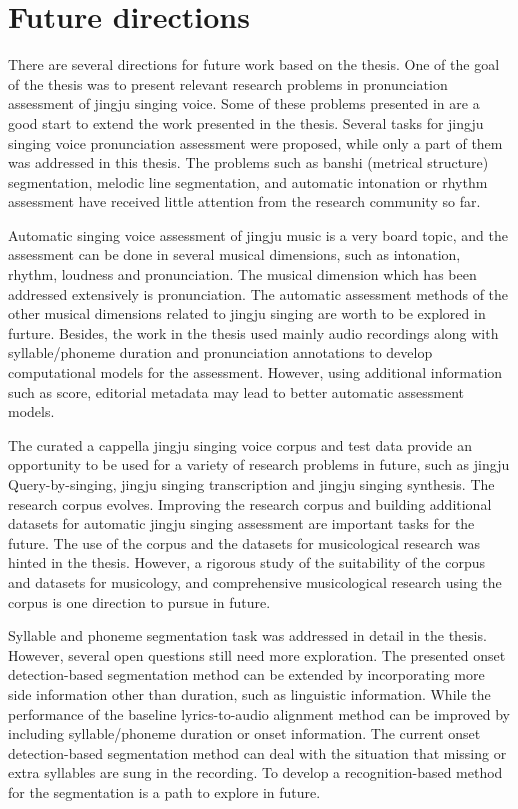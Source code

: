 \section{Future directions}

There are several directions for future work based on the thesis. One of the goal of the thesis was to present relevant research problems in pronunciation assessment of jingju singing voice. Some of these problems presented in  are a good start to extend the work presented in the thesis. Several tasks for jingju singing voice pronunciation assessment were proposed, while only a part of them was addressed in this thesis. The problems such as banshi (metrical structure) segmentation, melodic line segmentation, and automatic intonation or rhythm assessment have received little attention from the research community so far.

Automatic singing voice assessment of jingju music is a very board topic, and the assessment can be done in several musical dimensions, such as intonation, rhythm, loudness and pronunciation. The musical dimension which has been addressed extensively is pronunciation. The automatic assessment methods of the other musical dimensions related to jingju singing are worth to be explored in furture. Besides, the work in the thesis used mainly audio recordings along with syllable/phoneme duration and pronunciation annotations to develop computational models for the assessment. However, using additional information such as score, editorial metadata may lead to better automatic assessment models.

The curated a cappella jingju singing voice corpus and test data provide an opportunity to be used for a variety of research problems in future, such as jingju Query-by-singing, jingju singing transcription and jingju singing synthesis. The research corpus evolves. Improving the research corpus and building additional datasets for automatic jingju singing assessment are important tasks for the future. The use of the corpus and the datasets for musicological research was hinted in the thesis. However, a rigorous study of the suitability of the corpus and datasets for musicology, and comprehensive musicological research using the corpus is one direction to pursue in future.

Syllable and phoneme segmentation task was addressed in detail in the thesis. However, several open questions still need more exploration. The presented onset detection-based segmentation method can be extended by incorporating more side information other than duration, such as linguistic information. While the performance of the baseline lyrics-to-audio alignment method can be improved by including syllable/phoneme duration or onset information. The current onset detection-based segmentation method can deal with the situation that missing or extra syllables are sung in the recording. To develop a recognition-based method for the segmentation is a path to explore in future.

